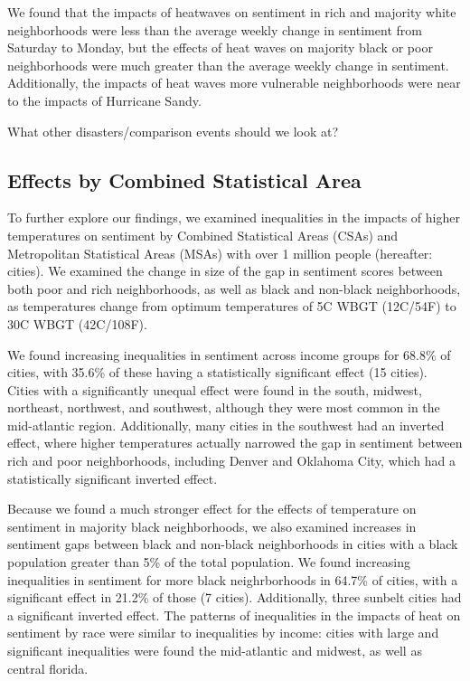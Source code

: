 \documentclass{article}
\begin{document}
We found that the impacts of heatwaves on sentiment in rich and majority white neighborhoods were less than the average weekly change in sentiment from Saturday to Monday, but the effects of heat waves on majority black or poor neighborhoods were much greater than the average weekly change in sentiment.  Additionally, the impacts of heat waves more vulnerable neighborhoods were near to the impacts of Hurricane Sandy.

{\color{red} What other disasters/comparison events should we look at?}

\subsection{Effects by Combined Statistical Area}

To further explore our findings, we examined inequalities in the impacts of higher temperatures on sentiment by Combined Statistical Areas (CSAs) and Metropolitan Statistical Areas (MSAs) with over 1 million people (hereafter: cities).  We examined the change in size of the gap in sentiment scores between both poor and rich neighborhoods, as well as black and non-black neighborhoods, as temperatures change from optimum temperatures of 5\textdegree C WBGT (12\textdegree C/54\textdegree F) to 30\textdegree C WBGT (42\textdegree C/108\textdegree F).

We found increasing inequalities in sentiment across income groups for 68.8\% of cities, with 35.6\% of these having a statistically significant effect (15 cities).  Cities with a significantly unequal effect were found in the south, midwest, northeast, northwest, and southwest, although they were most common in the mid-atlantic region.  Additionally, many cities in the southwest had an inverted effect, where higher temperatures actually narrowed the gap in sentiment between rich and poor neighborhoods, including Denver and Oklahoma City, which had a statistically significant inverted effect.

Because we found a much stronger effect for the effects of temperature on sentiment in majority black neighborhoods, we also examined increases in sentiment gaps between black and non-black neighborhoods in cities with a black population greater than 5\% of the total population.  We found increasing inequalities in sentiment for more black neighrborhoods in 64.7\% of cities, with a significant effect in 21.2\% of those (7 cities).  Additionally, three sunbelt cities had a significant inverted effect.  The patterns of inequalities in the impacts of heat on sentiment by race were similar to inequalities by income: cities with large and significant inequalities were found the mid-atlantic and midwest, as well as central florida.
\end{document}
